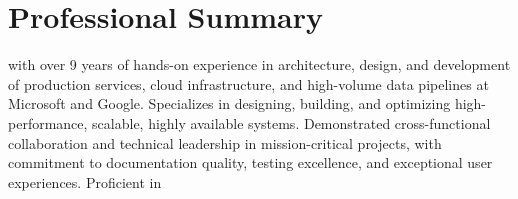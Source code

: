 \section{Professional Summary}
\normalsize{\POSITION{} with over 9 years of hands-on experience in architecture, design, and development of production services, cloud infrastructure, and high-volume data pipelines at Microsoft and Google. Specializes in designing, building, and optimizing high-performance, scalable, highly available systems. Demonstrated cross-functional collaboration and technical leadership in mission-critical projects, with commitment to documentation quality, testing excellence, and exceptional user experiences. Proficient in \LanguagesOrderSummary\MainTechnologies}
